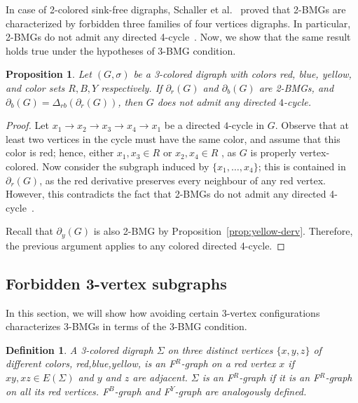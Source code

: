 \documentclass[final,3p,times]{elsarticle}
\newtheorem{proposition}[theorem]{Proposition}%
\newtheorem{definition}{Definition}[section]
\begin{document}
In case of 2-colored sink-free digraphs, Schaller et al.~\cite{schaller2021complexity} proved that 2-BMGs are characterized by forbidden three families of four vertices digraphs. In particular, 2-BMGs do not admit any directed 4-cycle~\cite[Theorem~4.4]{schaller2021complexity}. Now, we show that the same result holds true under the hypotheses of 3-BMG condition.     
\begin{proposition}
Let $(G,\sigma)$ be a 3-colored digraph with colors red, blue, yellow, and color sets $R,B,Y$ respectively. If $\partial_r(G)$ and $\partial_b(G)$ are 2-BMGs, and $\partial_b(G)=\Delta_{rb}(\partial_r(G))$, then $G$ does not admit any directed $4$-cycle.
\end{proposition}
\begin{proof}
Let $x_1\rightarrow x_2\rightarrow x_3 \rightarrow x_4 \rightarrow x_1$ be a directed $4$-cycle in $G$. Observe that at least two vertices in the cycle must have the same color, and assume that this color is red; hence, either $x_1,x_3\in R$ or $x_2,x_4\in R$ , as $G$ is properly vertex-colored. Now consider the subgraph induced by $\{x_1,\ldots, x_4\}$; this is contained in $\partial_r(G)$, as the red derivative preserves every neighbour of any red vertex. However, this contradicts the fact that 2-BMGs do not admit any directed 4-cycle~\cite[Theorem~4.4]{schaller2021complexity}.

Recall that $\partial_y(G)$ is also 2-BMG by Proposition~\ref{prop:yellow-derv}. Therefore, the previous argument applies to any colored directed 4-cycle.
\end{proof}

\subsection{Forbidden 3-vertex subgraphs}
\label{sec:forbidden_graphs}
In this section, we will show how avoiding certain 3-vertex configurations characterizes 3-BMGs in terms of the 3-BMG condition. 

\begin{definition}
\label{def:color-triangular}
A 3-colored digraph $\Sigma$ on three distinct vertices $\{x,y,z\}$ of different colors, red,blue,yellow, is an \emph{F$^R$-graph on a red vertex} $x$ if $xy,xz\in E(\Sigma)$ and $y$ and $z$ are adjacent. $\Sigma$ is an \emph{F$^R$-graph} if it is an F$^R$-graph on all its red vertices. F$^B$-graph and F$^Y$-graph are analogously defined. 
\end{definition}
\end{document}

